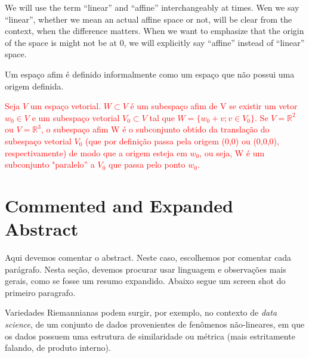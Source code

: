 \documentclass[a4paper,titlepage]{article}
\newcommand{\juliana}[1]{\textcolor{red}{#1}}
\begin{document}
We will use the term ``linear'' and ``affine'' interchangeably at times.
Wen we say ``linear'', whether we mean an actual affine space or not, 
will be clear from the context, when the difference matters. When we 
want to emphasize that the origin of the space is might not be at 0,
we will explicitly say ``affine'' instead of ``linear'' space.

Um espaço afim é definido informalmente como um espaço que não possui uma origem
definida.

\juliana{Seja $V$ um espaço vetorial. $W \subset V$ é um subespaço afim de V se
existir um vetor $w_0 \in V$ e um subespaço vetorial $V_0 \subset V$ tal que
$W=\{w_0 +v ; v \in V_0 \}$.} \juliana{Se $V=\mathbb{R}^2$ ou $V=\mathbb{R}^3$,
o subespaço afim W é o subconjunto obtido da translação do subespaço vetorial
$V_0$ (que por definição passa pela origem (0,0) ou (0,0,0), respectivamente) de
modo que a origem esteja em $w_0$, ou seja, W é um subconjunto "paralelo'' a
$V_0$ que passa pelo ponto $w_0$.}




\section{Commented and Expanded Abstract}

Aqui devemos comentar o abstract. Neste caso, escolhemos por comentar
cada parágrafo. Nesta seção, devemos procurar usar linguagem e observações mais
gerais, como se fosse um resumo expandido. Abaixo segue um screen shot do primeiro paragrafo.

{
\vspace{1em}
\vspace{1em}
}

Variedades Riemannianas podem surgir, por exemplo, no contexto de \emph{data
science}, de um conjunto de dados provenientes de fenômenos não-lineares, em que
os dados possuem uma estrutura de similaridade ou métrica (mais estritamente
falando, de produto interno).
\end{document}
